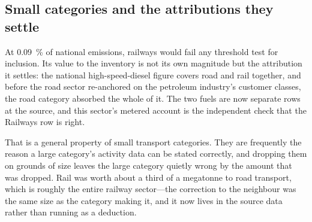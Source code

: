 \subsection{Small categories and the attributions they settle}

At \SI{0.09}{\percent} of national emissions, railways would fail any threshold test for
inclusion. Its value to the inventory is not its own magnitude but the attribution it
settles: the national high-speed-diesel figure covers road and rail together, and before the
road sector re-anchored on the petroleum industry's customer classes, the road category
absorbed the whole of it. The two fuels are now separate rows at the source, and this
sector's metered account is the independent check that the Railways row is right.

That is a general property of small transport categories. They are frequently the reason a
large category's activity data can be stated correctly, and dropping them on grounds of size
leaves the large category quietly wrong by the amount that was dropped. Rail was worth about
a third of a megatonne to road transport, which is roughly the entire railway sector---the
correction to the neighbour was the same size as the category making it, and it now lives in
the source data rather than running as a deduction.
